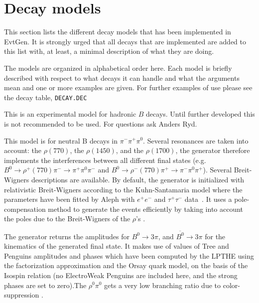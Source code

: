 \section{Decay models}
\label{sect:models}

This section lists the different decay models that has been 
implemented in EvtGen. It is strongly urged that all decays that
are implemented are added to this list with, at least, a minimal 
description of what they are doing. 

The models are organized in alphabetical order here. Each model
is briefly described with respect to what decays it can handle and
what the arguments mean and one or more examples are given. For
further examples of use please see the decay table, {\tt DECAY.DEC}


\label{bhadronic}



\Expl
This is an experimental model for hadronic $B$ decays. Until
further developed this is not recommended to be used. For
questions ask Anders Ryd.


\label{bto3picp}



\Expl

This model is for neutral B decays in $\pi^-\pi^+\pi^0$. 
Several resonances are taken into account: the $\rho(770)$, the $\rho(1450)$, and the $\rho(1700)$, the generator therefore implements the interferences between all different final states (e.g. $B^0 \rightarrow \rho^+(770) \pi^- \rightarrow \pi^+\pi^0\pi^-$ and $B^0 \rightarrow \rho^-(770) \pi^+ \rightarrow \pi^-\pi^0\pi^+$). Several Breit-Wigners descriptions are available. By default, the generator is initialized with relativistic Breit-Wigners according to the Kuhn-Santamaria model where the parameters have been fitted by Aleph with $e^+e^-$ and $\tau^+\tau^-$ data~\cite{AlephRho}.
It uses a pole-compensation method to generate the events efficiently by taking into account the poles due to the Breit-Wigners of the $\rho$'s \cite{3piNote}. 

The generator returns the amplitudes for $B^0 \rightarrow 3\pi$, and $\overline{B^0} \rightarrow 3\pi$ for the kinematics of the generated final state. It makes use of values of Tree and Penguins amplitudes and phases which have
been computed by the LPTHE using the factorization approximation and the Orsay
quark model, on the basis of the Isospin relation (no ElectroWeak Penguins
are included here, and the strong phases are set to zero).The $\rho^0\pi^0$ gets a very low branching ratio due to color-suppression \cite{3piBook}.

